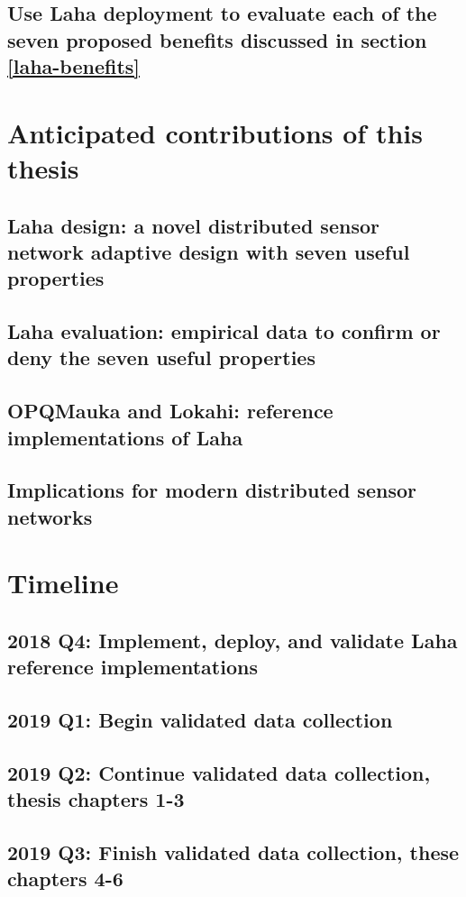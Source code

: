 \subsection{Use Laha deployment to evaluate each of the seven proposed benefits discussed in section \ref{laha-benefits}}

\section{Anticipated contributions of this thesis}
\subsection{Laha design: a novel distributed sensor network adaptive design with seven useful properties}
\subsection{Laha evaluation: empirical data to confirm or deny the seven useful properties}
\subsection{OPQMauka and Lokahi: reference implementations of Laha}
\subsection{Implications for modern distributed sensor networks}

\section{Timeline}
\subsection{2018 Q4: Implement, deploy, and validate Laha reference implementations}
\subsection{2019 Q1: Begin validated data collection}
\subsection{2019 Q2: Continue validated data collection, thesis chapters 1-3}
\subsection{2019 Q3: Finish validated data collection, these chapters 4-6}





